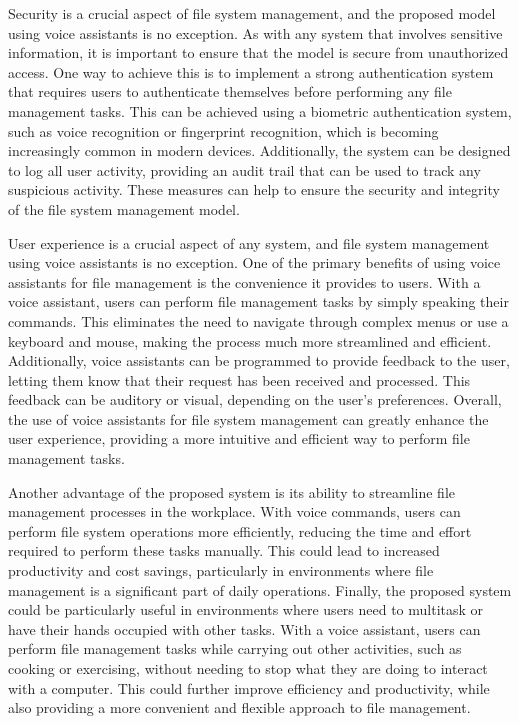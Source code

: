 \documentclass[conference]{IEEEtran}
\begin{document}
\par Security is a crucial aspect of file system management, and the proposed model using voice assistants is no exception. As with any system that involves sensitive information, it is important to ensure that the model is secure from unauthorized access. One way to achieve this is to implement a strong authentication system that requires users to authenticate themselves before performing any file management tasks. This can be achieved using a biometric authentication system, such as voice recognition or fingerprint recognition, which is becoming increasingly common in modern devices. Additionally, the system can be designed to log all user activity, providing an audit trail that can be used to track any suspicious activity. These measures can help to ensure the security and integrity of the file system management model.

\par User experience is a crucial aspect of any system, and file system management using voice assistants is no exception. One of the primary benefits of using voice assistants for file management is the convenience it provides to users. With a voice assistant, users can perform file management tasks by simply speaking their commands. This eliminates the need to navigate through complex menus or use a keyboard and mouse, making the process much more streamlined and efficient. Additionally, voice assistants can be programmed to provide feedback to the user, letting them know that their request has been received and processed. This feedback can be auditory or visual, depending on the user's preferences. Overall, the use of voice assistants for file system management can greatly enhance the user experience, providing a more intuitive and efficient way to perform file management tasks.

\par Another advantage of the proposed system is its ability to streamline file management processes in the workplace. With voice commands, users can perform file system operations more efficiently, reducing the time and effort required to perform these tasks manually. This could lead to increased productivity and cost savings, particularly in environments where file management is a significant part of daily operations. Finally, the proposed system could be particularly useful in environments where users need to multitask or have their hands occupied with other tasks. With a voice assistant, users can perform file management tasks while carrying out other activities, such as cooking or exercising, without needing to stop what they are doing to interact with a computer. This could further improve efficiency and productivity, while also providing a more convenient and flexible approach to file management.
\end{document}
